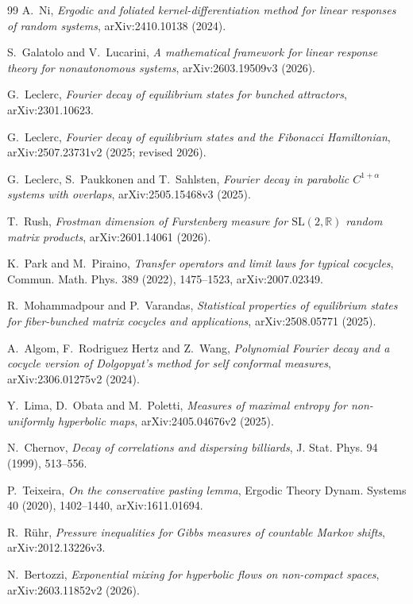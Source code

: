\documentclass[11pt]{article}
\begin{document}
\begin{thebibliography}{99}
A.~Ni,
\emph{Ergodic and foliated kernel-differentiation method for linear
responses of random systems}, arXiv:2410.10138 (2024).

S.~Galatolo and V.~Lucarini,
\emph{A mathematical framework for linear response theory for nonautonomous
systems}, arXiv:2603.19509v3 (2026).

G.~Leclerc,
\emph{Fourier decay of equilibrium states for bunched attractors},
arXiv:2301.10623.

G.~Leclerc,
\emph{Fourier decay of equilibrium states and the Fibonacci Hamiltonian},
arXiv:2507.23731v2 (2025; revised 2026).

G.~Leclerc, S.~Paukkonen and T.~Sahlsten,
\emph{Fourier decay in parabolic $C^{1+\alpha}$ systems with overlaps},
arXiv:2505.15468v3 (2025).

T.~Rush,
\emph{Frostman dimension of Furstenberg measure for
$\mathrm{SL}(2,\mathbb R)$ random matrix products},
arXiv:2601.14061 (2026).

K.~Park and M.~Piraino,
\emph{Transfer operators and limit laws for typical cocycles},
Commun. Math. Phys. 389 (2022), 1475--1523,
arXiv:2007.02349.

R.~Mohammadpour and P.~Varandas,
\emph{Statistical properties of equilibrium states for fiber-bunched
matrix cocycles and applications},
arXiv:2508.05771 (2025).

A.~Algom, F.~Rodriguez Hertz and Z.~Wang,
\emph{Polynomial Fourier decay and a cocycle version of Dolgopyat's method
for self conformal measures}, arXiv:2306.01275v2 (2024).

Y.~Lima, D.~Obata and M.~Poletti,
\emph{Measures of maximal entropy for non-uniformly hyperbolic maps},
arXiv:2405.04676v2 (2025).

N.~Chernov,
\emph{Decay of correlations and dispersing billiards},
J. Stat. Phys. 94 (1999), 513--556.

P.~Teixeira,
\emph{On the conservative pasting lemma},
Ergodic Theory Dynam. Systems 40 (2020), 1402--1440,
arXiv:1611.01694.

R.~R\"uhr,
\emph{Pressure inequalities for Gibbs measures of countable Markov shifts},
arXiv:2012.13226v3.

N.~Bertozzi,
\emph{Exponential mixing for hyperbolic flows on non-compact spaces},
arXiv:2603.11852v2 (2026).


\end{thebibliography}
\end{document}
